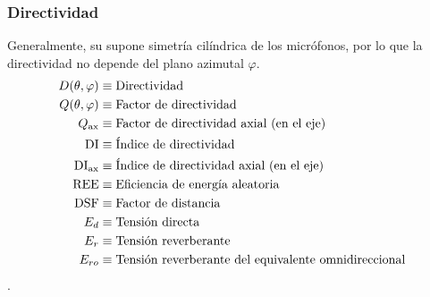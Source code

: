 \documentclass[a4paper, 8pt]{extarticle}
\begin{document}
\begin{multicols}{3}
  \subsubsection{Directividad}
  Generalmente, su supone simetría cilíndrica de los micrófonos, por lo que la directividad no depende del plano azimutal $\varphi$.
  \begin{align*}
    D(\theta, \varphi )          & \equiv \text{Directividad}                                         \\
    Q(\theta, \varphi )          & \equiv \text{Factor de directividad}                               \\
    Q _{\textnormal{ax}}         & \equiv \text{Factor de directividad axial (en el eje)}             \\
    \text{DI}                    & \equiv \text{Índice de directividad}                               \\
    \text{DI} _{\textnormal{ax}} & \equiv \text{Índice de directividad axial (en el eje)}             \\
    \text{REE}                   & \equiv \text{Eficiencia de energía aleatoria}                      \\
    \text{DSF}                   & \equiv \text{Factor de distancia}                                  \\
    E_d                          & \equiv \text{Tensión directa}                                      \\
    E_r                          & \equiv \text{Tensión reverberante}                                 \\
    E_{ro}                       & \equiv \text{Tensión reverberante del equivalente omnidireccional} \\
  \end{align*}.


\end{multicols}
\end{document}
